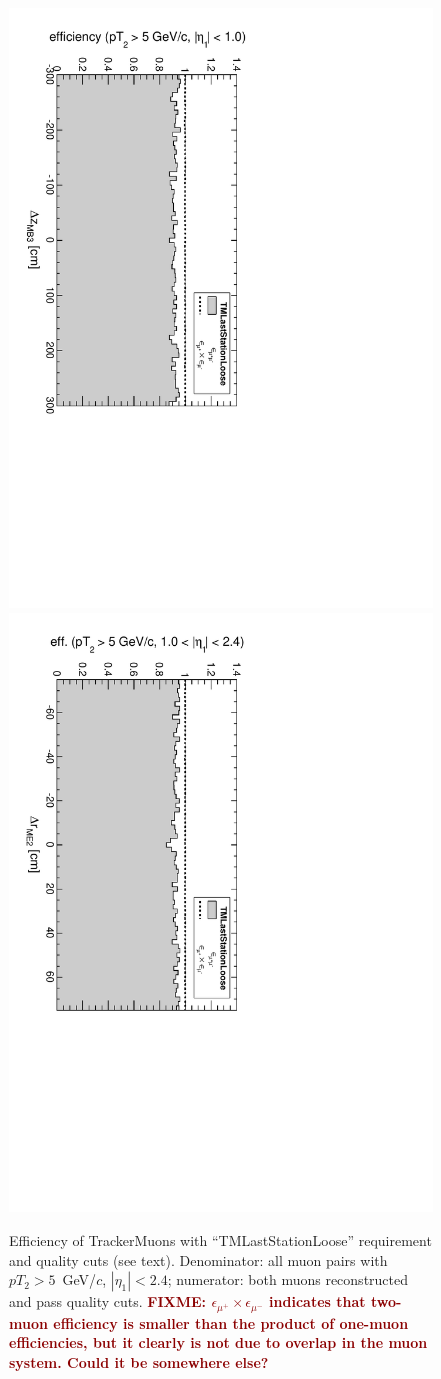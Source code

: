 \documentclass[12pt]{article}
\newcommand{\fixme}[1]{\textcolor{darkred}{\bf FIXME: #1}}
\begin{document}
\begin{figure}
\includegraphics[height=0.5\linewidth, angle=90]{fig/acceptance8_plot/vsmb3dz_TMLastStationLoose.pdf}
\includegraphics[height=0.5\linewidth, angle=90]{fig/acceptance8_plot/vsme2dr_TMLastStationLoose.pdf}

\caption{Efficiency of TrackerMuons with ``TMLastStationLoose'' requirement and quality cuts (see text).  Denominator: all muon pairs with $pT_2 > 5$~GeV/$c$, $|\eta_1| < 2.4$; numerator: both muons reconstructed and pass quality cuts. \fixme{$\epsilon_{\mu^+} \times \epsilon_{\mu^-}$ indicates that two-muon efficiency is smaller than the product of one-muon efficiencies, but it clearly is not due to overlap in the muon system.  Could it be somewhere else?} \label{fig:efficiencies_TMLastStationLoose}}
\end{figure}
\end{document}
